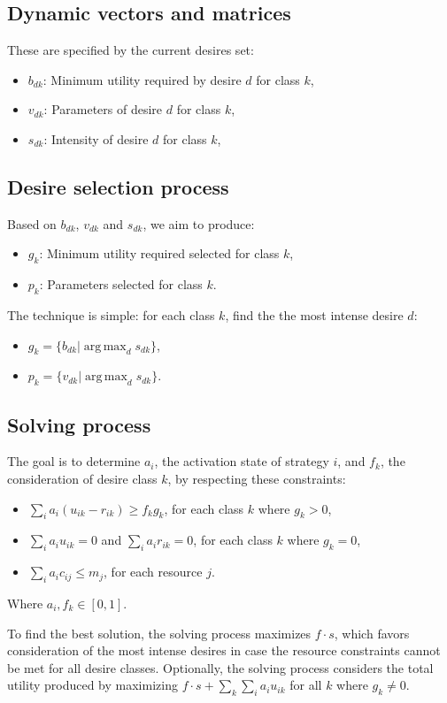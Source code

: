 \documentclass[12pt]{article}
\DeclareMathOperator*{\argmax}{arg\,max}
\begin{document}
\subsection*{Dynamic vectors and matrices} 

These are specified by the current desires set:

\begin{itemize}
	\item $b_{dk}$: Minimum utility required by desire $d$ for class $k$,
	\item $v_{dk}$: Parameters of desire $d$ for class $k$,
	\item $s_{dk}$: Intensity of desire $d$ for class $k$,
\end{itemize}

\subsection*{Desire selection process}

Based on $b_{dk}$, $v_{dk}$ and $s_{dk}$, we aim to produce:

\begin{itemize}
	\item $g_{k}$: Minimum utility required selected for class $k$,
	\item $p_{k}$: Parameters selected for class $k$.
\end{itemize}

The technique is simple: for each class $k$, find the the most intense desire $d$:

\begin{itemize}
	\item $g_{k} = \{ b_{dk} | \argmax_d s_{dk} \} $,
	\item $p_{k} = \{ v_{dk} | \argmax_d s_{dk} \} $. 
\end{itemize}

\subsection*{Solving process}
The goal is to determine $a_{i}$, the activation state of strategy $i$, and
$f_{k}$, the consideration of desire class $k$, by respecting these constraints:

\begin{itemize}
	\item $\sum\limits_i a_i (u_{ik} - r_{ik}) \geq f_k g_k$, for each class $k$
        where $g_k > 0$, 
	\item $\sum\limits_i a_i u_{ik} = 0$ and $\sum\limits_i a_i r_{ik} = 0$, for each class $k$
        where $g_k = 0$, 
	\item $\sum\limits_i a_i c_{ij} \leq m_j$, for each resource $j$.
\end{itemize}

Where $a_i, f_k \in [0,1]$.

To find the best solution, the solving process maximizes $f \cdot s$, which 
favors consideration of the most intense desires in case the resource 
constraints cannot be met for all desire classes.
Optionally, the solving process considers the total utility produced by maximizing $f \cdot s + \sum\limits_k\sum\limits_i a_i u_{ik}$ for all $k$ where $g_k \neq 0$.
\end{document}
